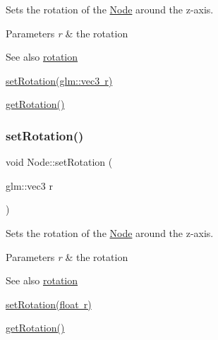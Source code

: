 Sets the rotation of the \mbox{\hyperlink{classsage_1_1Node}{Node}} around the z-\/axis. 


\begin{DoxyParams}{Parameters}
{\em r} & the rotation \\
\hline
\end{DoxyParams}
\begin{DoxySeeAlso}{See also}
\mbox{\hyperlink{classsage_1_1Node_a7f338279775e186e48336145a5d69241}{rotation}} 

\mbox{\hyperlink{classsage_1_1Node_aec0a7e0159605b7701a8b156d78ef967}{set\+Rotation(glm\+::vec3 r)}} 

\mbox{\hyperlink{classsage_1_1Node_aff82a2e9d9add8b8c3633482da5e6d88}{get\+Rotation()}} 
\end{DoxySeeAlso}
\mbox{\label{classsage_1_1Node_aec0a7e0159605b7701a8b156d78ef967}} 
\subsubsection{\texorpdfstring{setRotation()}{setRotation()}\hspace{0.1cm}{\footnotesize\ttfamily [2/2]}}
{\footnotesize\ttfamily void Node\+::set\+Rotation (\begin{DoxyParamCaption}\item[{glm\+::vec3}]{r }\end{DoxyParamCaption})}



Sets the rotation of the \mbox{\hyperlink{classsage_1_1Node}{Node}} around the z-\/axis. 


\begin{DoxyParams}{Parameters}
{\em r} & the rotation \\
\hline
\end{DoxyParams}
\begin{DoxySeeAlso}{See also}
\mbox{\hyperlink{classsage_1_1Node_a7f338279775e186e48336145a5d69241}{rotation}} 

\mbox{\hyperlink{classsage_1_1Node_a422e877f5a830ad4d50b8e13250ee553}{set\+Rotation(float r)}} 

\mbox{\hyperlink{classsage_1_1Node_aff82a2e9d9add8b8c3633482da5e6d88}{get\+Rotation()}} 
\end{DoxySeeAlso}
\mbox{\label{classsage_1_1Node_a939698b2eb68ee5b60b91e2426e95369}} 

